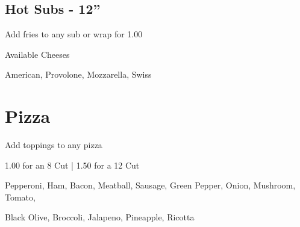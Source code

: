 \documentclass[11pt,a4paper,sans]{moderncv}        %
\begin{document}



\subsection{Hot Subs - 12”}
\centerline{Add fries to any sub or wrap for 1.00}
\centerline{Available Cheeses}
\centerline{American, Provolone, Mozzarella, Swiss}

\section{Pizza}
\centerline{Add toppings to any pizza}
\centerline{1.00 for an 8 Cut | 1.50 for a 12 Cut}
\centerline{Pepperoni, Ham, Bacon, Meatball, Sausage, Green Pepper, Onion, Mushroom, Tomato,}
\centerline{Black Olive, Broccoli, Jalapeno, Pineapple, Ricotta}
\end{document}
